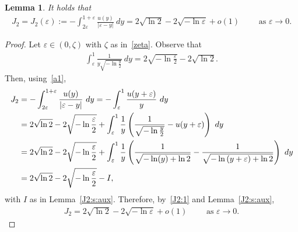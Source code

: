 \documentclass[11pt]{article}
\newcommand{\eps}{{\varepsilon}}
\numberwithin{equation}{section}
\newtheorem{lemma}[theorem]{Lemma}
\begin{document}
\begin{lemma}\label{J2:s}
It holds that
\begin{align}\label{J2:c:1}
J_2=J_2(\eps):=-\int_{2\eps}^{1+\eps}\frac{u(y)}{|\eps-y|}\ dy = 2\sqrt{\ln 2}-2\sqrt{-\ln \eps}+o(1)\qquad \text{ as }\eps\to 0.
\end{align}
\end{lemma}
\begin{proof}
Let $\eps\in(0,\zeta)$ with $\zeta$ as in~\eqref{zeta}. Observe that
\begin{align}\label{a1}
\int_{\eps}^1 \frac{1}{y\sqrt{-\ln \frac{y}{2}}}\ dy=2\sqrt{-\ln\frac{\eps}{2}}-2\sqrt{\ln 2}.
\end{align}
Then, using~\eqref{a1},
\begin{align}
J_2
&=-\int_{2\eps}^{1+\eps}\frac{u(y)}{|\eps-y|}\ dy 
=-\int_{\eps}^{1}\frac{u(y+\eps)}{y}\ dy\notag\\
&=2\sqrt{\ln 2}-2\sqrt{-\ln\frac{\eps}{2}}
+\int_{\eps}^{1}\frac{1}{y}\left(\frac{1}{\sqrt{-\ln \frac{y}{2}}}-u(y+\eps)\right)\ dy\notag\\
&=
2\sqrt{\ln 2}-2\sqrt{-\ln\frac{\eps}{2}}
+\int_{\eps}^{1}\frac{1}{y}\left(\frac{1}{\sqrt{-\ln (y)+\ln 2}}-\frac{1}{\sqrt{-\ln{(y+\eps)+\ln 2}}}\right)\ dy\notag\\
&=
2\sqrt{\ln 2}-2\sqrt{-\ln\frac{\eps}{2}}
-I,\label{J2:1}
\end{align}
with $I$ as in Lemma~\ref{J2:s:aux}. Therefore, by~\eqref{J2:1} and Lemma~\ref{J2:s:aux},
\begin{align*}
J_2=2\sqrt{\ln 2}-2\sqrt{-\ln \eps}+o(1)\qquad \text{ as }\eps\to 0.
\end{align*}
\end{proof}
\end{document}
